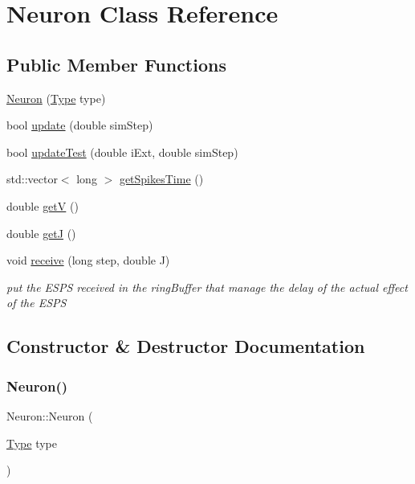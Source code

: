 \hypertarget{class_neuron}{}\section{Neuron Class Reference}
\label{class_neuron}
\subsection*{Public Member Functions}
\begin{DoxyCompactItemize}
\item 
\hyperlink{class_neuron_aafdc2e6e981b524d6de8453116751009}{Neuron} (\hyperlink{neuron_8hpp_a1d1cfd8ffb84e947f82999c682b666a7}{Type} type)
\item 
bool \hyperlink{class_neuron_a28f735ec9735d7a41306a517307bf69f}{update} (double sim\+Step)
\item 
bool \hyperlink{class_neuron_a0776f227945fe6082a1e080039158972}{update\+Test} (double i\+Ext, double sim\+Step)
\item 
std\+::vector$<$ long $>$ \hyperlink{class_neuron_a34710c23e78097abdad63ff0abc544d8}{get\+Spikes\+Time} ()
\item 
double \hyperlink{class_neuron_ad3d6daf9c6c1aa35dc55afb362d74a55}{getV} ()
\item 
double \hyperlink{class_neuron_a785e7e450147879ffd9e4ba385f870b0}{getJ} ()
\item 
void \hyperlink{class_neuron_a39df21c3ca040d88bc50f87f3af0ed35}{receive} (long step, double J)
\begin{DoxyCompactList}\small\item\em put the E\+S\+PS received in the ring\+Buffer that manage the delay of the actual effect of the E\+S\+PS \end{DoxyCompactList}\end{DoxyCompactItemize}


\subsection{Constructor \& Destructor Documentation}
\mbox{\label{class_neuron_aafdc2e6e981b524d6de8453116751009}} 
\subsubsection{\texorpdfstring{Neuron()}{Neuron()}}
{\footnotesize\ttfamily Neuron\+::\+Neuron (\begin{DoxyParamCaption}\item[{\hyperlink{neuron_8hpp_a1d1cfd8ffb84e947f82999c682b666a7}{Type}}]{type }\end{DoxyParamCaption})}

